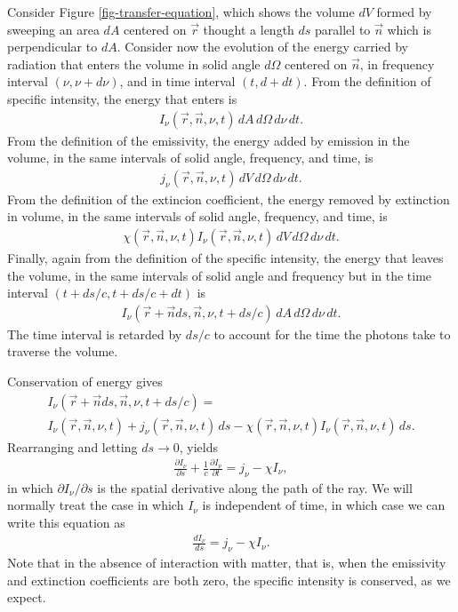 Consider Figure \ref{fig-transfer-equation}, which shows the
volume $dV$ formed by sweeping an area $dA$ centered on
$\vec r$ thought a length $ds$ parallel to $\vec n$ which is
perpendicular to $dA$. Consider now the evolution of the
energy carried by radiation that enters the volume in solid
angle $d\Omega$ centered on $\vec n$, in frequency interval
$(\nu,\nu+d\nu)$, and in time interval $(t,d+dt)$. From the
definition of specific intensity, the energy that enters is
\begin{align}
I_\nu(\vec r,\vec n,\nu,t)\,dA\,d\Omega\,d\nu\,dt.
\end{align}
From the definition of the emissivity, the energy
added by emission in the volume, in the same intervals of
solid angle, frequency, and time, is
\begin{align}
j_\nu(\vec r,\vec n,\nu,t)\,dV\,d\Omega\,d\nu\,dt.
\end{align}
From the definition of the extincion coefficient, the energy
removed by extinction in volume, in the same intervals of
solid angle, frequency, and time, is
\begin{align}
\chi(\vec r,\vec n,\nu,t) I_\nu(\vec r,\vec n,\nu,t)\,dV\,d\Omega\,d\nu\,dt.
\end{align}
Finally, again from the definition of the specific
intensity, the energy that leaves the volume, in the same
intervals of solid angle and frequency but in the time
interval $(t + ds/c, t + ds/c + dt)$ is
\begin{align}
I_\nu(\vec r + \vec n ds, \vec n,\nu,t + ds/c)
\,dA\,d\Omega\,d\nu\,dt.
\end{align}
The time interval is retarded by $ds/c$ to account for the
time the photons take to traverse the volume.

\newslide

Conservation of energy gives
\begin{multline}
I_\nu(\vec r + \vec n ds, \vec n,\nu,t +
 ds/c)
 =\\
I_\nu(\vec r,\vec n,\nu,t) 
+ j_\nu(\vec r,\vec n,\nu,t)\,ds
- \chi(\vec r,\vec n,\nu,t) I_\nu(\vec r,\vec n,\nu,t)\,ds.
\end{multline}
Rearranging and letting $ds \rightarrow 0$, yields
\begin{align}
\frac{\partial I_\nu}{\partial s}
+ \frac{1}{c} \frac{\partial I_\nu}{\partial t}
= j_\nu -\chi I_\nu,
\end{align}
in which $\partial I_\nu/\partial s$ is the spatial
derivative along the path of the ray. We will normally treat
the case in which $I_\nu$ is independent of time, in which
case we can write this equation as
\begin{align}
\frac{d I_\nu}{ds}
= j_\nu -\chi I_\nu.
\end{align}
Note that in the absence of interaction with matter, that is, when the
emissivity and extinction coefficients are both zero, the specific
intensity is conserved, as we expect.

